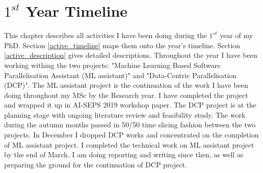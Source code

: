 \documentclass[10pt,a4paper]{report}
\begin{document}
\chapter{$1^{st}$ Year Timeline}
\quad This chapter describes all activities I have been doing during the $1^{st}$ year of my PhD. Section \ref{active_timeline} maps them onto the year's timeline. Section \ref{active_description} gives detailed descriptions. Throughout the year I have been working withing the two projects: "Machine Learning Based Software Parallelisation Assistant (ML assistant)" and "Data-Centric Parallelisation (DCP)". The ML assistant project is the continuation of the work I have been doing throughout my MSc by the Research year. I have completed the project and wrapped it up in AI-SEPS 2019 workshop paper. The DCP project is at the planning stage with ongoing literature review and feasibility study. The work during the autumn months passed in 50/50 time slicing fashion between the two projects. In December I dropped DCP works and concentrated on the completion of ML assistant project. I completed the technical work on ML assistant project by the end of March. I am doing reporting and writing since then, as well as preparing the ground for the continuation of DCP project.
   
\end{document}
